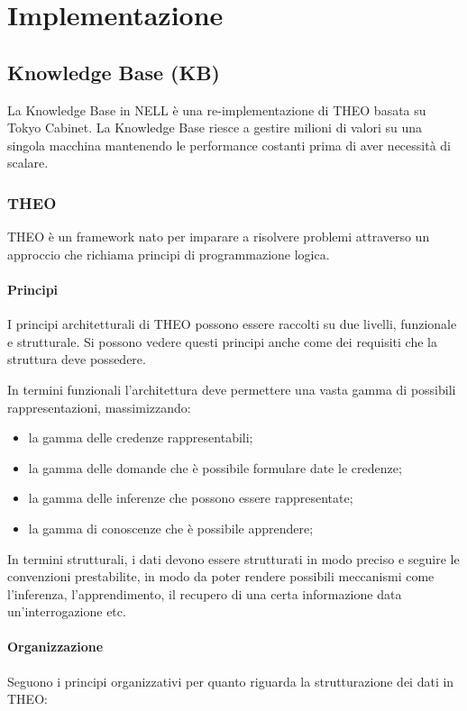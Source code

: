 \section{Implementazione}
\label{impl}
\subsection{Knowledge Base (KB)}
La Knowledge Base in NELL è una re-implementazione di THEO basata su Tokyo Cabinet. La Knowledge Base riesce a gestire milioni di valori su una singola macchina mantenendo le performance costanti prima di aver necessità di scalare\cite{TowardAnArchitecture:online}.
\subsubsection{THEO}
THEO è un framework nato per imparare a risolvere problemi attraverso un approccio che richiama principi di programmazione logica. 
\paragraph{Principi}
I principi architetturali di THEO possono essere raccolti su due livelli, funzionale e strutturale. Si possono vedere questi principi anche come dei requisiti che la struttura deve possedere.

\noindent In termini funzionali l'architettura deve permettere una vasta gamma di possibili rappresentazioni, massimizzando:
\begin{itemize}
	\item la gamma delle credenze rappresentabili;
	\item la gamma delle domande che è possibile formulare date le credenze;
	\item la gamma delle inferenze che possono essere rappresentate;
	\item la gamma di conoscenze che è possibile apprendere;
\end{itemize}

\noindent In termini strutturali, i dati devono essere strutturati in modo preciso e seguire le convenzioni prestabilite, in modo da poter rendere possibili meccanismi come l'inferenza, l'apprendimento, il recupero di una certa informazione data un'interrogazione etc.

\paragraph{Organizzazione}
Seguono i principi organizzativi per quanto riguarda la strutturazione dei dati in THEO:


